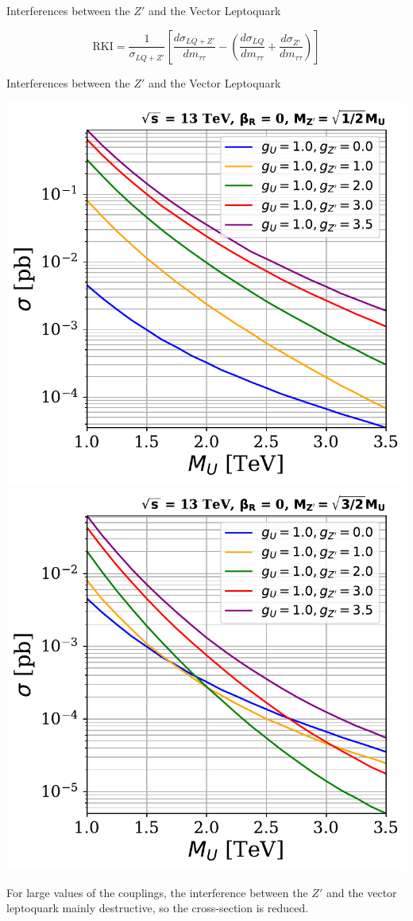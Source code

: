 \documentclass{../bredelebeamer}
\begin{document}
\begin{frame}{Interferences between the $Z'$ and the Vector Leptoquark}
\begin{minipage}{.48\linewidth}
		\begin{equation*}
			\mathrm{RKI}=\frac{1}{\sigma_{ LQ+Z'}}\left[\frac{d\sigma_{ LQ+Z'}}{dm_{\tau\tau}}-\left(\frac{d\sigma_{ LQ}}{dm_{\tau\tau}}+\frac{d\sigma_{Z'}}{dm_{\tau\tau}}\right)\right]
		\end{equation*}
	\end{minipage}	
\end{frame}

\begin{frame}{Interferences between the $Z'$ and the Vector Leptoquark}
	\begin{center}
		\includegraphics[width=.48\linewidth]{XS_gu_gzp_lower_limit_woRHC.pdf}
		\includegraphics[width=.48\linewidth]{XS_gu_gzp_upper_limit_woRHC.pdf}
	\end{center}
	{\large 
		For large values of the couplings, the interference between the $Z'$ and the vector leptoquark mainly destructive, so the cross-section is reduced.
	}
\end{frame}
\end{document}
